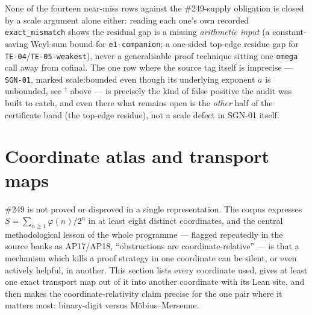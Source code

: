 \documentclass[11pt]{article}
\theoremstyle{breakplain}
\theoremstyle{breakdefinition}
\theoremstyle{breakdefinition}
\newcommand{\scale}[1]{{\small\textsf{scale:#1}}\xspace}
\begin{document}
None of the fourteen near-miss rows against the \#249-supply obligation is closed by a scale
argument alone either: reading each one's own recorded \texttt{exact\_mismatch} shows the residual
gap is a missing \emph{arithmetic input} (a constant-saving Weyl-sum bound for
\texttt{e1-companion}; a one-sided top-edge residue gap for \texttt{TE-04}/\texttt{TE-05-weakest}), never a
generalisable proof technique sitting one \texttt{omega} call away from cofinal. The one row where
the source tag itself is imprecise — \texttt{SGN-01}, marked \scale{bounded} even though its
underlying exponent $a$ is unbounded, see $^\dagger$ above — is precisely the kind of false
positive the audit was built to catch, and even there what remains open is the \emph{other} half of
the certificate band (the top-edge residue), not a scale defect in SGN-01 itself.

\section{Coordinate atlas and transport maps}

\#249 is not proved or disproved in a single representation. The corpus expresses
$S=\sum_{n\ge1}\varphi(n)/2^n$ in at least eight distinct coordinates, and the central
methodological lesson of the whole programme — flagged repeatedly in the source banks as
AP17/AP18, ``obstructions are coordinate-relative'' — is that a mechanism which kills a proof
strategy in one coordinate can be silent, or even actively helpful, in another. This section lists
every coordinate used, gives at least one exact transport map out of it into another coordinate
with its Lean site, and then makes the coordinate-relativity claim precise for the one pair where
it matters most: binary-digit versus M\"obius--Mersenne.
\end{document}
